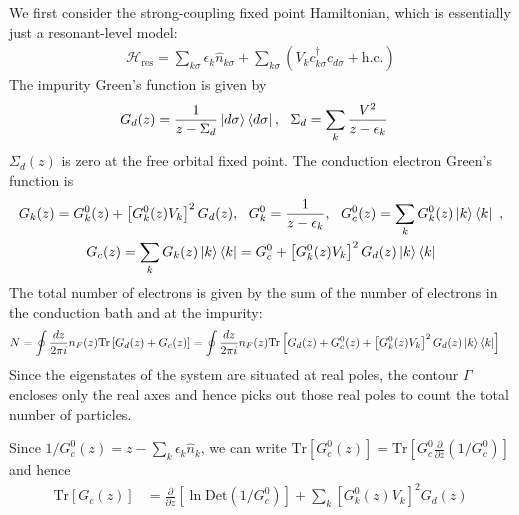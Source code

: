 \documentclass[10pt]{report}
\numberwithin{equation}{section}
\begin{document}
We first consider the strong-coupling fixed point Hamiltonian, which is essentially just a resonant-level model:
\begin{equation}\begin{aligned}
	\mathcal{H}_\text{res} = \sum_{k\sigma}\epsilon_k \hat n_{k\sigma} + \sum_{k\sigma}\left(V_k c^\dagger_{k\sigma} c_{d\sigma} + \text{h.c.}\right)
\end{aligned}\end{equation}
The impurity Green's function is given by~\cite{anderson_1961,hewson1993,coleman2015}
\begin{equation}\begin{aligned}
	G_{d}(z) &= \frac{1}{z - \Sigma_d}\ket{d\sigma}\bra{d\sigma}, ~ ~ \Sigma_d = \sum_k \frac{V^2}{z - \epsilon_k}
\end{aligned}\end{equation}
\(\Sigma_d(z)\) is zero at the free orbital fixed point. The conduction electron Green's function is 
\begin{gather}
	G_{k}(z) = G_k^0(z) + \left[G_k^0(z)V_k\right]^2 G_{d}(z), ~ ~ G_k^0 = \frac{1}{z - \epsilon_k}, ~ ~ G_c^0(z) = \sum_k G_k^0(z)\ket{k}\bra{k}~,\\
	G_c(z) = \sum_k G_k(z)\ket{k}\bra{k} = G_c^0 + \left[G_k^0(z)V_k\right]^2 G_{d}(z)\ket{k}\bra{k} 
\end{gather}
The total number of electrons is given by the sum of the number of electrons in the conduction bath and at the impurity:
\begin{equation}\begin{aligned}
	\label{tot_num}
	N &= \oint \frac{dz}{2\pi i}n_F(z) \text{Tr}\left[G_{d}(z) + G_c(z)\right] = \oint \frac{dz}{2\pi i}n_F(z) \text{Tr}\left[G_{d}(z) + G_c^0(z) + \left[G_k^0(z)V_k\right]^2 G_{d}(z)\ket{k}\bra{k}\right]
\end{aligned}\end{equation}
Since the eigenstates of the system are situated at real poles, the contour \(\Gamma\) encloses only the real axes and hence picks out those real poles to count the total number of particles.

Since \(1/G_{c}^0(z) = z - \sum_k \epsilon_k \hat n_k\), we can write \(\text{Tr}\left[G_{c}^{0}(z)\right] = \text{Tr}\left[G_{c}^{0} \frac{\partial{}}{\partial{z}}\left(1/G_{c}^{0}\right)\right]\) and hence
\begin{equation}\begin{aligned}
	\label{simple_bath}
	\text{Tr}\left[G_c(z)\right] &=\frac{\partial{}}{\partial{z}}\left[\ln \text{Det}\left(1/G_{c}^{0}\right)\right] + \sum_k\left[G_k^0(z)V_k\right]^2 G_{d}(z)
\end{aligned}\end{equation}
\end{document}
